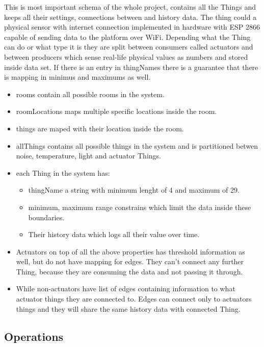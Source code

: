 \documentclass{article}
\begin{document}
This is most important schema of the whole project, contains all the Things and keeps all their settings, connections between  and history data. The thing could a physical sensor with internet connection implemented in hardware with ESP 2866 capable of sending data to the platform over WiFi. Depending what the Thing can do or what type it is they are split between consumers called actuators and between producers which sense real-life physical values as numbers and stored inside data set. If there is an entry in thingNames there is a guarantee that there is mapping in minimus and maximums as well. 


\begin{itemize}
  \item rooms contain all possible rooms in the system.
  \item roomLocations maps multiple specific locations inside the room.
  \item things are maped with their location inside the room.
  \item allThings contains all possible things in the system and is partitioned betwen noise, temperature, light and actuator Things.
  \item each Thing in the system has:
	\begin{itemize}
   		\item thingName a string with minimum lenght of 4 and maximum of 29.
   		\item minimum, maximum range constrains which limit the data inside these boundaries.
   		\item Their history data which logs all their value over time.
	\end{itemize}
  \item Actuators on top of all the above properties has threshold information as well, but do not have mapping for edges. They can't connect any further Thing, because they are consuming the data and not passing it through.
  \item While non-actuators have list of edges containing information to what actuator things they are connected to. Edges can connect only to actuators things and they will share the same history data with connected Thing.
  
\end{itemize}




\newpage
\subsection{Operations}
\end{document}
